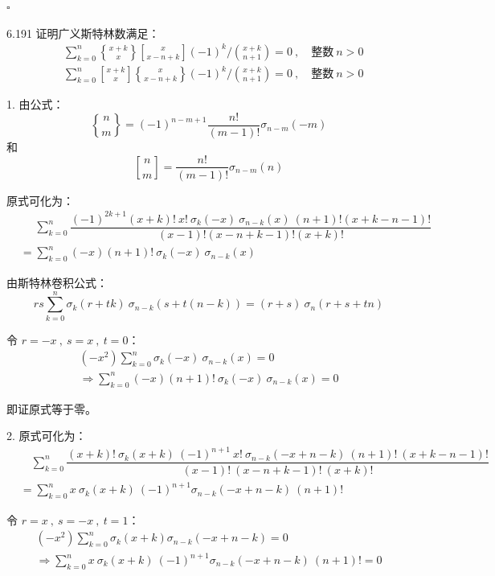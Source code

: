 \hfill \( \square \)

\begin{problem}{6.19}{1}
  证明广义斯特林数满足：
  \begin{align*}
    & \sum_{k=0}^n \genfrac{\{}{\}}{0pt}{} {x+k}{x} \genfrac{[}{]}{0pt}{} {x}{x-n+k} (-1)^k \bigg/ \binom{x+k}{n+1} = 0 \ , \quad \text{整数} \ n > 0 \\
    & \sum_{k=0}^n \genfrac{[}{]}{0pt}{} {x+k}{x} \genfrac{\{}{\}}{0pt}{} {x}{x-n+k}  (-1)^k \bigg/ \binom{x+k}{n+1} = 0 \ , \quad \text{整数} \ n > 0
  \end{align*}
\end{problem}

1. 由公式：
\[
  \boxed{\genfrac{\{}{\}}{0pt}{} {n}{m} = (-1)^{n-m+1} \frac{n!}{(m-1)!} \sigma_{n-m} (-m)}
\]
和
\[
  \boxed{\genfrac{[}{]}{0pt}{} {n}{m} = \frac{n!}{(m-1)!} \sigma_{n-m} (n)}
\]

原式可化为：
\begin{align*}
  &\phantom{=} \sum_{k=0}^n \dfrac{(-1)^{2k+1} (x+k)! \ x! \ \sigma_{k} (-x) \ \sigma_{n-k} (x) \ (n+1)! (x+k-n-1)!}{(x-1)! (x-n+k-1)! (x+k)!} \\
  &= \sum_{k=0}^n (-x) (n+1)! \ \sigma_{k} (-x) \ \sigma_{n-k} (x)
\end{align*}

由斯特林卷积公式：
\[
  \boxed{rs \sum_{k=0}^n \sigma_k(r+tk) \ \sigma_{n-k}(s+t(n-k)) = (r+s) \ \sigma_n(r+s+tn)}
\]

令 \( r = -x \ , \ s = x \ , \ t = 0 \)：
\begin{gather*}
  (-x^2) \sum_{k=0}^n \sigma_k(-x) \ \sigma_{n-k}(x) = 0 \\
  \Rightarrow \sum_{k=0}^n (-x) (n+1)! \ \sigma_{k} (-x) \ \sigma_{n-k} (x) = 0
\end{gather*}

即证原式等于零。

2. 原式可化为：
\begin{align*}
  & \quad \sum_{k=0}^n \dfrac{(x+k)! \ \sigma_k(x+k) \ (-1)^{n+1} \ x! \ \sigma_{n-k} (-x+n-k) \ (n+1)! \ (x+k-n-1)!}{(x-1)! \ (x-n+k-1)! \ (x+k)!} \\
  &= \sum_{k=0}^n x \ \sigma_k (x+k) \ (-1)^{n+1} \sigma_{n-k}(-x+n-k) \  (n+1)!
\end{align*}

令 \( r = x \ , \ s = -x \ , \ t = 1 \)：
\begin{gather*}
  (-x^2) \sum_{k=0}^n \sigma_k(x + k) \sigma_{n-k} (-x + n - k) = 0 \\
  \Rightarrow \sum_{k=0}^n x \ \sigma_k (x+k) \ (-1)^{n+1} \sigma_{n-k}(-x+n-k) \  (n+1)! = 0
\end{gather*}

